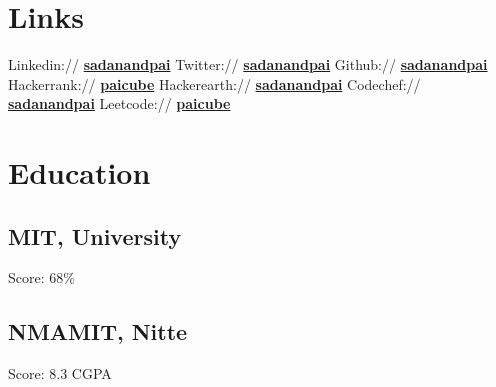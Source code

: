 \documentclass{resumecustom}%
\begin{document}
%
\pagestyle{fancy}%
\fancyhf{}%
\lastupdated%
%
\begin{minipage}{0.31\textwidth}%
\section{Links}%
\label{sec:Links}%
Linkedin:// %
\href{https://www.linkedin.com/in/sadanandpai/}{\textbf{sadanandpai}}%
\newline%
%
Twitter:// %
\href{https://www.twitter.com/sadanandpai/}{\textbf{sadanandpai}}%
\newline%
%
Github:// %
\href{https://github.com/sadanandpai/}{\textbf{sadanandpai}}%
\newline%
%
Hackerrank:// %
\href{https://www.hackerrank.com/paicube/}{\textbf{paicube}}%
\newline%
%
Hackerearth:// %
\href{https://www.hackerearth.com/sadanandpai/}{\textbf{sadanandpai}}%
\newline%
%
Codechef:// %
\href{https://www.codechef.com/sadanandpai/}{\textbf{sadanandpai}}%
\newline%
%
Leetcode:// %
\href{https://leetcode.com/paicube/}{\textbf{paicube}}%
\newline%

%
\section{Education}%
\label{sec:Education}%
\subsection{MIT, University}%
\label{subsec:MIT,University}%
%
%
Score: 68\%%
\sectionsep

%
\subsection{NMAMIT, Nitte}%
\label{subsec:NMAMIT,Nitte}%
%
%
Score: 8.3 CGPA%
\sectionsep

%
\end{minipage}%
\hfill%
\begin{minipage}{0.66\textwidth}%
%
\end{minipage}%
\end{document}
